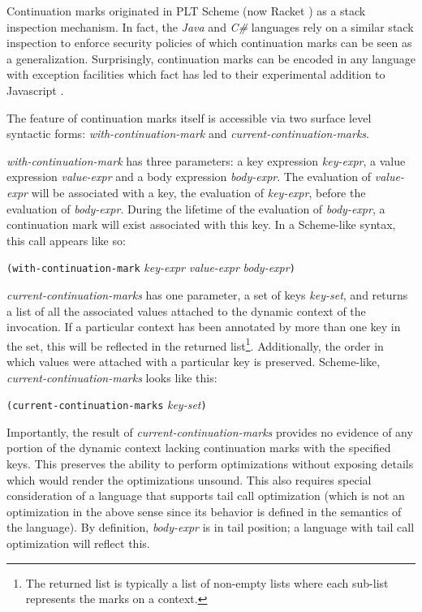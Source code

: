 \documentclass[ms]{byuprop}
\newcounter{definition}
\begin{document}
Continuation marks originated in PLT Scheme (now Racket \cite{plt-tr1}) as a stack 
inspection mechanism. In fact, the \emph{Java} and \emph{C\#} languages rely on a similar 
stack inspection to enforce security policies of which continuation marks can be seen as 
a generalization. Surprisingly, continuation marks can be encoded in any language with 
exception facilities \cite{pettyjohn2005continuations} which fact has led to their 
experimental addition to Javascript \cite{clements2008implementing}.

The feature of continuation marks itself is accessible via two surface level syntactic
forms: \emph{with-continuation-mark} and \emph{current-continuation-marks}.

\emph{with-continuation-mark} has three parameters: a key expression \emph{key-expr}, a 
value expression \emph{value-expr} and a body expression \emph{body-expr}. The evaluation 
of \emph{value-expr} will be associated with a key, the evaluation of \emph{key-expr}, 
before the evaluation of \emph{body-expr}. During the lifetime of the evaluation of 
\emph{body-expr}, a continuation mark will exist associated with this key. In a Scheme-like 
syntax, this call appears like so:

\texttt{(with-continuation-mark} \emph{key-expr} \emph{value-expr} \emph{body-expr}\texttt{)}

\emph{current-continuation-marks} has one parameter, a set of keys \emph{key-set}, and returns a list of
all the associated values attached to the dynamic context of the invocation. If a particular 
context has been annotated by more than one key in the set, this will be reflected in the 
returned list\footnote{The returned list is typically a list of non-empty lists where each 
sub-list represents the marks on a context.}. Additionally, the order in which values were 
attached with a particular key is preserved. Scheme-like, \emph{current-continuation-marks}
looks like this:

\texttt{(current-continuation-marks} \emph{key-set}\texttt{)}

Importantly, the result of \emph{current-continuation-marks} provides no evidence of any portion of the
dynamic context lacking continuation marks with the specified keys. This preserves the
ability to perform optimizations without exposing details which would render the
optimizations unsound. This also requires special consideration of a language that
supports tail call optimization (which is not an optimization in the above sense since its
behavior is defined in the semantics of the language). By definition, \emph{body-expr} is 
in tail position; a language with tail call optimization will reflect this.
\end{document}
